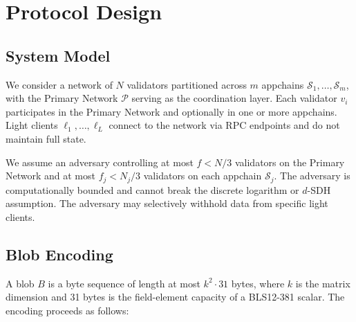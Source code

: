 \section{Protocol Design}

\label{sec:protocol}

\subsection{System Model}

We consider a network of $N$ validators partitioned across $m$ appchains
$\mathcal{S}_1, \ldots, \mathcal{S}_m$, with the Primary Network $\mathcal{P}$ serving as
the coordination layer. Each validator $v_i$ participates in the Primary Network and optionally
in one or more appchains. Light clients $\ell_1, \ldots, \ell_L$ connect to the network via
RPC endpoints and do not maintain full state.

\begin{definition}
We assume an adversary controlling at most $f < N/3$ validators on the Primary Network and at
most $f_j < N_j/3$ validators on each appchain $\mathcal{S}_j$. The adversary is computationally
bounded and cannot break the discrete logarithm or $d$-SDH assumption. The adversary may
selectively withhold data from specific light clients.
\end{definition}

\subsection{Blob Encoding}
\label{sec:protocol:encoding}

A blob $B$ is a byte sequence of length at most $k^2 \cdot 31$ bytes, where $k$ is the matrix
dimension and 31 bytes is the field-element capacity of a BLS12-381 scalar. The encoding
proceeds as follows:

